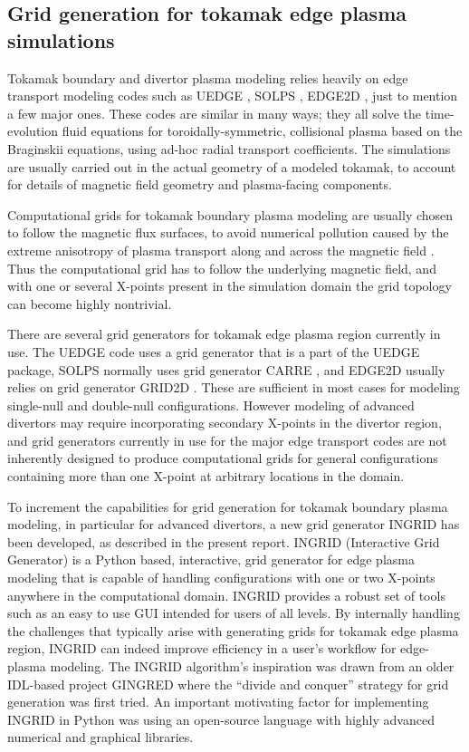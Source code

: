 \subsection{Grid generation for tokamak edge plasma simulations}

Tokamak boundary and divertor plasma modeling relies heavily on edge
transport modeling codes such as UEDGE \cite{Rognlien1999}, SOLPS
\cite{Wiesen2015}, EDGE2D \cite{Simonini1994}, just to mention a few
major ones. These codes are similar in many ways; they all solve the
time-evolution fluid equations for toroidally-symmetric, collisional
plasma based on the Braginskii equations, using ad-hoc radial
transport coefficients. The simulations are usually carried out in the
actual geometry of a modeled tokamak, to account for details of
magnetic field geometry and plasma-facing components.

Computational grids for tokamak boundary plasma modeling are usually
chosen to follow the magnetic flux surfaces, to avoid numerical
pollution caused by the extreme anisotropy of plasma transport along
and across the magnetic field \cite{Umansky2005}. Thus the
computational grid has to follow the underlying magnetic field, and
with one or several X-points present in the simulation domain the grid
topology can become highly nontrivial.

There are several grid generators for tokamak edge plasma region
currently in use. The UEDGE code uses a grid generator that is a part
of the UEDGE package, SOLPS normally uses grid generator CARRE
\cite{Marchand1996}, and EDGE2D usually relies on grid generator GRID2D
\cite{Taroni1992}. These are sufficient in most cases for modeling
single-null and double-null configurations. However modeling of
advanced divertors may require incorporating secondary X-points in the
divertor region, and grid generators currently in use for the major
edge transport codes are not inherently designed to produce
computational grids for general configurations containing more than
one X-point at arbitrary locations in the domain.

To increment the capabilities for grid generation for tokamak boundary
plasma modeling, in particular for advanced divertors, a new grid
generator INGRID has been developed, as described in the present
report.  INGRID (Interactive Grid Generator) is a Python based,
interactive, grid generator for edge plasma modeling that is capable
of handling configurations with one or two X-points anywhere in the
computational domain. INGRID provides a robust set of tools such as an
easy to use GUI intended for users of all levels. By internally
handling the challenges that typically arise with generating grids for
tokamak edge plasma region, INGRID can indeed improve efficiency in a
user's workflow for edge-plasma modeling. The INGRID algorithm's
inspiration was drawn from an older IDL-based project GINGRED
\cite{Izacard2017} where the ``divide and conquer'' strategy for
grid generation was first tried. An important motivating factor for
implementing INGRID in Python was using an open-source language with
highly advanced numerical and graphical libraries.


